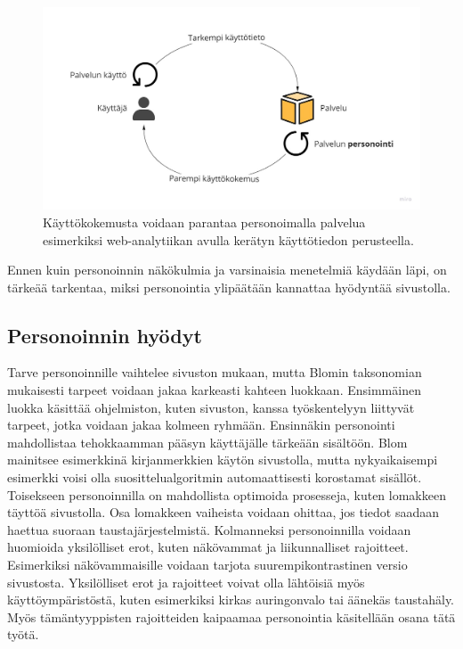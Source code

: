 \documentclass[finnish, 12pt, a4paper, elec, utf8, a-1b, online]{aaltothesis}
\begin{document}
\begin{figure}[h]
    \centering
    \includegraphics[width=\textwidth]{images/personalization.jpg}
    \caption{Käyttökokemusta voidaan parantaa personoimalla palvelua esimerkiksi
    web-analytiikan avulla kerätyn käyttötiedon
    perusteella.~\label{fig:personalization}}
\end{figure}

Ennen kuin personoinnin näkökulmia ja varsinaisia menetelmiä käydään läpi, on
tärkeää tarkentaa, miksi personointia ylipäätään kannattaa hyödyntää
sivustolla.

\subsection{Personoinnin hyödyt}\label{personalization-pros}

Tarve personoinnille vaihtelee sivuston mukaan, mutta Blomin taksonomian
mukaisesti tarpeet voidaan jakaa karkeasti kahteen luokkaan. Ensimmäinen luokka
käsittää ohjelmiston, kuten sivuston, kanssa työskentelyyn liittyvät tarpeet,
jotka voidaan jakaa kolmeen ryhmään. Ensinnäkin personointi mahdollistaa
tehokkaamman pääsyn käyttäjälle tärkeään sisältöön. Blom mainitsee esimerkkinä
kirjanmerkkien käytön sivustolla, mutta nykyaikaisempi esimerkki voisi olla
suosittelualgoritmin automaattisesti korostamat sisällöt. Toisekseen
personoinnilla on mahdollista optimoida prosesseja, kuten lomakkeen täyttöä
sivustolla. Osa lomakkeen vaiheista voidaan ohittaa, jos tiedot saadaan haettua
suoraan taustajärjestelmistä. Kolmanneksi personoinnilla voidaan huomioida
yksilölliset erot, kuten näkövammat ja liikunnalliset rajoitteet. Esimerkiksi
näkövammaisille voidaan tarjota suurempikontrastinen versio sivustosta.
Yksilölliset erot ja rajoitteet voivat olla lähtöisiä myös käyttöympäristöstä,
kuten esimerkiksi kirkas auringonvalo tai äänekäs taustahäly. Myös
tämäntyyppisten rajoitteiden kaipaamaa personointia käsitellään osana tätä
työtä.
\end{document}
